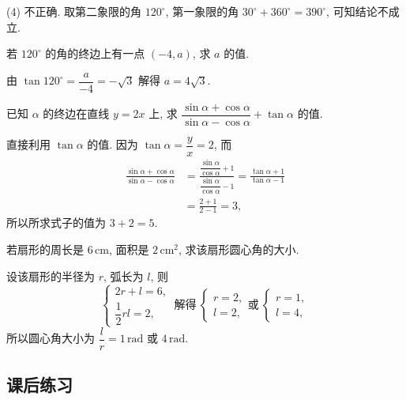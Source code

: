     (4) 不正确. 取第二象限的角 $120^\circ$, 第一象限的角 $30^\circ+360^\circ= 390^\circ$, 可知结论不成立.
\endsolution

\begin{exercise}
    若 $120^\circ$ 的角的终边上有一点 $(-4,a)$, 求 $a$ 的值.
\end{exercise}
\beginsolution
    由 $\tan120^\circ= \dfrac{a}{-4}= -\sqrt3$ 解得 $a=4\sqrt3$.
\endsolution

\begin{exercise}
    已知 $\alpha$ 的终边在直线 $y=2x$ 上, 求 
    $\dfrac{\sin\alpha+ \cos\alpha}{\sin\alpha-\cos\alpha} +\tan\alpha$ 的值.
\end{exercise}
\beginsolution
    直接利用 $\tan\alpha$ 的值.
    因为 $\tan\alpha= \dfrac{y}{x}= 2$, 而
    \[\begin{aligned}
        \frac{\sin\alpha+ \cos\alpha}{\sin\alpha-\cos\alpha}
        &= \frac{\dfrac{\sin\alpha}{\cos\alpha}+ 1}{\dfrac{\sin\alpha}{\cos\alpha}- 1}
        = \frac{\tan\alpha+ 1}{\tan\alpha- 1}\\
        &= \frac{2+1}{2-1}= 3,
    \end{aligned}\]
    所以所求式子的值为 $3+2=5$. 
\endsolution

\begin{exercise}
    若扇形的周长是 $6\,\mathrm{cm}$, 面积是 $2\,\text{cm}^2$, 求该扇形圆心角的大小.
\end{exercise}
\beginsolution
    设该扇形的半径为 $r$, 弧长为 $l$, 则
    \[\left\{\!\!\begin{array}{l}
        2r+l= 6,\\
        \dfrac12rl= 2,
    \end{array}\right.\ \text{解得}\ 
    \left\{\!\!\begin{array}{l}
        r=2,\\
        l=2,
    \end{array}\right.\text{或}\ 
    \left\{\!\!\begin{array}{l}
        r=1,\\
        l=4,
    \end{array}\right.\]
    所以圆心角大小为 $\dfrac{l}r= 1\,\mathrm{rad}$ 或 $4\,\mathrm{rad}$.
\endsolution

\subsection{课后练习}


